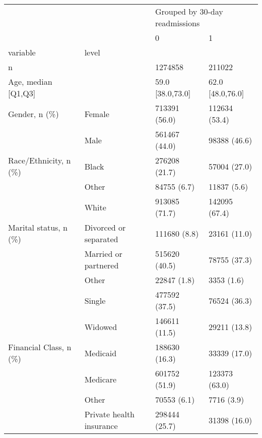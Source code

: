 \begin{tabular}{llll}
\toprule
                                       &   & \multicolumn{2}{l}{Grouped by 30-day readmissions} \\
                                       &   &                              0 &                  1 \\
variable & level &                                &                    \\
\midrule
n &   &                        1274858 &             211022 \\
Age, median [Q1,Q3] &   &               59.0 [38.0,73.0] &   62.0 [48.0,76.0] \\
Gender, n (\%) & Female &                  713391 (56.0) &      112634 (53.4) \\
                                       & Male &                  561467 (44.0) &       98388 (46.6) \\
Race/Ethnicity, n (\%) & Black &                  276208 (21.7) &       57004 (27.0) \\
                                       & Other &                    84755 (6.7) &        11837 (5.6) \\
                                       & White &                  913085 (71.7) &      142095 (67.4) \\
Marital status, n (\%) & Divorced or separated &                   111680 (8.8) &       23161 (11.0) \\
                                       & Married or partnered &                  515620 (40.5) &       78755 (37.3) \\
                                       & Other &                    22847 (1.8) &         3353 (1.6) \\
                                       & Single &                  477592 (37.5) &       76524 (36.3) \\
                                       & Widowed &                  146611 (11.5) &       29211 (13.8) \\
Financial Class, n (\%) & Medicaid &                  188630 (16.3) &       33339 (17.0) \\
                                       & Medicare &                  601752 (51.9) &      123373 (63.0) \\
                                       & Other &                    70553 (6.1) &         7716 (3.9) \\
                                       & Private health insurance &                  298444 (25.7) &       31398 (16.0) \\

\end{tabular}
